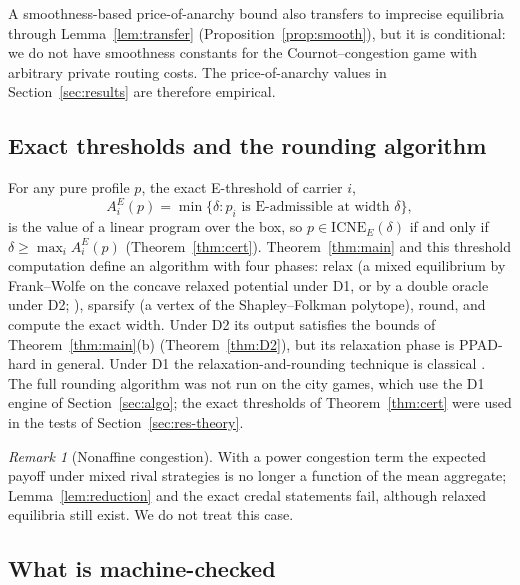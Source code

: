 \documentclass[preprint,12pt]{elsarticle}
\theoremstyle{definition}
\theoremstyle{remark}
\newtheorem{remark}[theorem]{Remark}
\newcommand{\ICNE}{\mathrm{ICNE}}
\begin{document}
A smoothness-based price-of-anarchy bound also transfers to imprecise equilibria through Lemma~\ref{lem:transfer} (Proposition~\ref{prop:smooth}), but it is conditional: we do not have smoothness constants for the Cournot--congestion game with arbitrary private routing costs. The price-of-anarchy values in Section~\ref{sec:results} are therefore empirical.

\subsection{Exact thresholds and the rounding algorithm}\label{sec:cert}

For any pure profile $p$, the exact E-threshold of carrier $i$,\[A^E_i(p)=\min\{\delta: p_i\text{ is E-admissible at width }\delta\},\]is the value of a linear program over the box, so $p\in\ICNE_E(\delta)$ if and only if $\delta\ge\max_iA^E_i(p)$ (Theorem~\ref{thm:cert}). Theorem~\ref{thm:main} and this threshold computation define an algorithm with four phases: relax (a mixed equilibrium by Frank--Wolfe on the concave relaxed potential under D1, or by a double oracle under D2; \citealp{McMahan2003}), sparsify (a vertex of the Shapley--Folkman polytope), round, and compute the exact width. Under D2 its output satisfies the bounds of Theorem~\ref{thm:main}(b) (Theorem~\ref{thm:D2}), but its relaxation phase is PPAD-hard in general. Under D1 the relaxation-and-rounding technique is classical \citep{Aubin1976,Udell2016,Bonnans2023}. The full rounding algorithm was not run on the city games, which use the D1 engine of Section~\ref{sec:algo}; the exact thresholds of Theorem~\ref{thm:cert} were used in the tests of Section~\ref{sec:res-theory}.

\begin{remark}[Nonaffine congestion]\label{rem:nonaffine}
With a power congestion term the expected payoff under mixed rival strategies is no longer a function of the mean aggregate; Lemma~\ref{lem:reduction} and the exact credal statements fail, although relaxed equilibria still exist. We do not treat this case.
\end{remark}

\subsection{What is machine-checked}\label{sec:lean}
\end{document}
